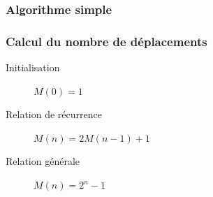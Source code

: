 \documentclass{beamer}%
\begin{document}
			\begin{frame}
				\frametitle{Algorithme simple}
				\begin{figure}
					\centering
					\setcounter{subfigure}{0}
					\qquad
				\end{figure}	
				\begin{figure}
					\centering
					\qquad
				\end{figure}
			\end{frame}
			
			\begin{frame}
				\frametitle{Calcul du nombre de déplacements}
				\begin{description}
					\item[Initialisation] $M(0) = 1$
					\item[Relation de récurrence] $M(n) = 2M(n-1) + 1$
					\item[Relation générale] $M(n) = 2^n - 1$
				\end{description}
			\end{frame}
			
\end{document}
